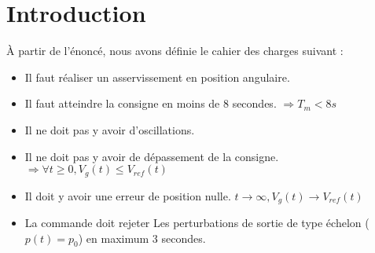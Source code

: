 \chapter*{Introduction}
\label{chap:Intro}

À partir de l'énoncé, nous avons définie le cahier des charges suivant :
\begin{itemize}
\item Il faut réaliser un asservissement en position angulaire.
\item Il faut atteindre la consigne en moins de 8 secondes. $\Rightarrow T_m<8s $
\item Il ne doit pas y avoir d'oscillations.
\item Il ne doit pas y avoir de dépassement de la consigne.$\Rightarrow \forall t \geq 0, V_g(t)\leq V_{ref}(t)$
\item Il doit y avoir une erreur de position nulle. $ t\rightarrow \infty, V_g(t) \rightarrow V_{ref}(t)$
\item La commande doit rejeter Les perturbations de sortie de type échelon ($p(t)=p_0$) en maximum 3 secondes.
\end{itemize}